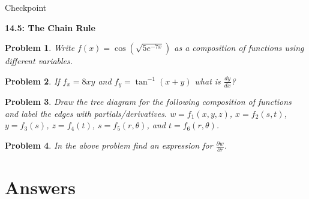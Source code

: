 \documentclass[11pt]{article}
\newtheorem{problem}{Problem}
\newcommand{\vs}{\vspace*{.1in}}
\begin{document}
\begin{huge}
    \begin{center}
        Checkpoint
    \end{center}
\end{huge}
\begin{large}\begin{center}\bf 14.5: The Chain Rule \end{center}
\end{large}

\vs\vs

\begin{problem}
Write $f(x)= \cos\left({\sqrt{5e^{-7x}}}   \right)$ as a composition of functions using different variables.
\end{problem}

\begin{problem}
If $f_x = 8xy$ and $f_y = \tan^{-1}(x+y)$ what is $\frac{dy}{dx}$?
\end{problem}

\begin{problem}
Draw the tree diagram for the following composition of functions and label the edges with partials/derivatives. $w=f_1(x,y,z)$, $x=f_2(s,t)$, $y= f_3(s)$, $z = f_4(t)$, $s = f_5(r, \theta)$, and $t = f_6(r,\theta)$.
\end{problem}


\begin{problem}
In the above problem find an expression for $\frac{\partial w}{\partial r}$.
\end{problem}




\newpage

\section{Answers}
\end{document}
